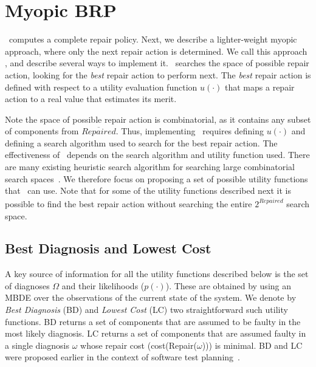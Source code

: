 \section{Myopic BRP}
\planbased\ computes a complete repair policy. Next, we describe a lighter-weight myopic approach, where only the next repair action is determined. We call this approach \myopic , and describe several ways to implement it.
\myopic\ searches the space of possible repair action, looking for the {\em best} repair action to perform next. The {\em best} repair action is defined with respect to a utility evaluation function $u(\cdot)$ that maps a repair action to a real value that estimates its merit.


Note the space of possible repair action is combinatorial, as it contains any subset of components from $\overline{Repaired}$. Thus, implementing \myopic\ requires defining $u(\cdot)$ and defining a search algorithm used to search for the best repair action.
The effectiveness of \myopic\ depends on the search algorithm and utility function used.
There are many existing heuristic search algorithm for searching large combinatorial search spaces~\cite{russell2010artificialIntelligence,edelkamp2011heuristic}. We therefore focus on proposing a set of possible utility functions that \myopic\ can use. Note that for some of the utility functions described next it is possible to find the best repair action without searching the entire $2^{\overline{Repaired}}$ search space.

\subsection{Best Diagnosis and Lowest Cost}
A key source of information for all the utility functions described below is the set of diagnoses $\Omega$ and their likelihoods ($p(\cdot)$). These are obtained by using an MBDE over the observations of the current state of the system. We denote by {\em Best Diagnosis} (BD) and {\em Lowest Cost} (LC) two straightforward such utility functions.
BD returns a set of components that are assumed to be faulty in the most likely diagnosis. LC returns a set of components that are assumed faulty in a single diagnosis $\omega$ whose repair cost (cost(Repair($\omega$))) is minimal. BD and LC were proposed earlier in the context of software test planning~\cite{stern2012using,zamir2014using}. %

